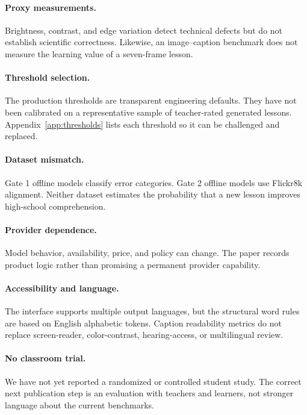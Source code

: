 \documentclass[11pt]{article}
\theoremstyle{plain}
\theoremstyle{definition}
\begin{document}
\paragraph{Proxy measurements.} Brightness, contrast, and edge variation detect technical defects but do not establish scientific correctness. Likewise, an image--caption benchmark does not measure the learning value of a seven-frame lesson.

\paragraph{Threshold selection.} The production thresholds are transparent engineering defaults. They have not been calibrated on a representative sample of teacher-rated generated lessons. Appendix~\ref{app:thresholds} lists each threshold so it can be challenged and replaced.

\paragraph{Dataset mismatch.} Gate 1 offline models classify error categories. Gate 2 offline models use Flickr8k alignment. Neither dataset estimates the probability that a new lesson improves high-school comprehension.

\paragraph{Provider dependence.} Model behavior, availability, price, and policy can change. The paper records product logic rather than promising a permanent provider capability.

\paragraph{Accessibility and language.} The interface supports multiple output languages, but the structural word rules are based on English alphabetic tokens. Caption readability metrics do not replace screen-reader, color-contrast, hearing-access, or multilingual review.

\paragraph{No classroom trial.} We have not yet reported a randomized or controlled student study. The correct next publication step is an evaluation with teachers and learners, not stronger language about the current benchmarks.
\end{document}
